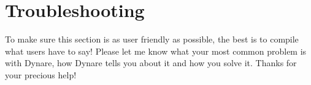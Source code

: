 \chapter{Troubleshooting} \label{ch:trouble}

To make sure this section is as user friendly as possible, the best is to compile what users have to say! Please let me know what your most common problem is with Dynare, how Dynare tells you about it and how you solve it. Thanks for your precious help!